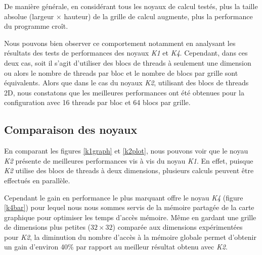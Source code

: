 \documentclass[11pt, twocolumn]{article}
\begin{document}
De manière générale, en considérant tous les noyaux de calcul testés, plus la taille absolue (largeur $\times$ hauteur) de la grille de calcul augmente, plus la performance du programme croît.

\par Nous pouvons bien observer ce comportement notamment en analysant les résultats des tests de performances des noyaux \textit{K1} et \textit{K4}. Cependant, dans ces deux cas, soit il s'agit d'utiliser des blocs de threads à seulement une dimension ou alors le nombre de threads par bloc et le nombre de blocs par grille sont équivalents. Alors que dans le cas du noyaux \textit{K2}, utilisant des blocs de threads 2D, nous constatons que les meilleures performances ont été obtenues pour la configuration avec 16 threads par bloc et 64 blocs par grille. 


\subsection{Comparaison des noyaux}

En comparant les figures \ref{k1graph} et \ref{k2plot}, nous pouvons voir que le noyau \textit{K2} présente de meilleures performances vis à vis du noyau \textit{K1}. En effet, puisque \textit{K2} utilise des blocs de threads à deux dimensions, plusieurs calculs peuvent être effectués en parallèle.

\par Cependant le gain en performance le plus marquant offre le noyau \textit{K4} (figure \ref{k4bar}) pour lequel nous nous sommes servis de la mémoire partagée de la carte graphique pour optimiser les temps d'accès mémoire. Même en gardant une grille de dimensions plus petites ($32 \times 32$) comparée aux dimensions expérimentées pour \textit{K2}, la diminution du nombre d'accès à la mémoire globale permet d'obtenir un gain d'environ 40\% par rapport au meilleur résultat obtenu avec \textit{K2}.
\end{document}
